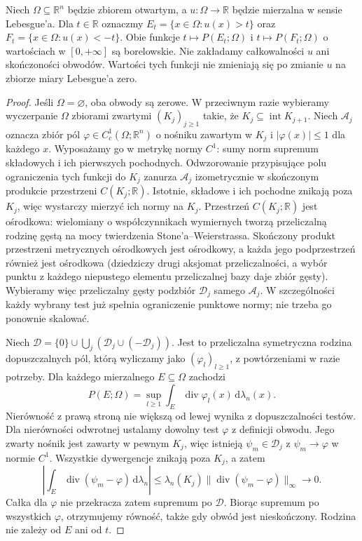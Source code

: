 \begin{lemat}
\label{lem:BV-level-meas-auditVI}
Niech $\Omega\subseteq\mathbb R^n$ będzie zbiorem otwartym,
a $u:\Omega\to\mathbb R$ będzie mierzalna
w sensie Lebesgue'a. Dla $t\in\mathbb R$ oznaczmy
$E_t=\{x\in\Omega:u(x)>t\}$ oraz
$F_t=\{x\in\Omega:u(x)<-t\}$.
Obie funkcje $t\mapsto P(E_t;\Omega)$ i
$t\mapsto P(F_t;\Omega)$ o wartościach
w $[0,+\infty]$ są borelowskie.
Nie zakładamy całkowalności $u$ ani skończoności
obwodów. Wartości tych funkcji nie zmieniają się
po zmianie $u$ na zbiorze miary Lebesgue'a zero.
\end{lemat}
\begin{proof}
Jeśli $\Omega=\varnothing$, oba obwody są zerowe.
W przeciwnym razie wybieramy wyczerpanie
$\Omega$ zbiorami zwartymi $(K_j)_{j\ge1}$
takie, że $K_j\subseteq\operatorname{int}K_{j+1}$.
Niech $\mathcal A_j$ oznacza zbiór pól
$\varphi\in C_c^1(\Omega;\mathbb R^n)$
o nośniku zawartym w $K_j$ i
$|\varphi(x)|\le1$ dla każdego $x$.
Wyposażamy go w metrykę normy $C^1$:
sumy norm supremum składowych i ich pierwszych
pochodnych. Odwzorowanie przypisujące polu
ograniczenia tych funkcji do $K_j$ zanurza
$\mathcal A_j$ izometrycznie w skończonym
produkcie przestrzeni $C(K_j;\mathbb R)$.
Istotnie, składowe i ich pochodne znikają
poza $K_j$, więc wystarczy mierzyć ich normy
na $K_j$. Przestrzeń $C(K_j;\mathbb R)$
jest ośrodkowa: wielomiany o współczynnikach
wymiernych tworzą przeliczalną rodzinę gęstą
na mocy twierdzenia Stone'a--Weierstrassa.
Skończony produkt przestrzeni metrycznych
ośrodkowych jest ośrodkowy, a każda jego
podprzestrzeń również jest ośrodkowa
(dziedziczy drugi aksjomat przeliczalności,
a wybór punktu z każdego niepustego elementu
przeliczalnej bazy daje zbiór gęsty).
Wybieramy więc przeliczalny gęsty podzbiór
$\mathcal D_j$ samego $\mathcal A_j$.
W szczególności każdy wybrany test już spełnia
ograniczenie punktowe normy; nie trzeba go
ponownie skalować.

Niech $\mathcal D=\{0\}\cup\bigcup_j
(\mathcal D_j\cup(-\mathcal D_j))$.
Jest to przeliczalna symetryczna rodzina
dopuszczalnych pól, którą wyliczamy jako
$(\varphi_l)_{l\ge1}$, z powtórzeniami w razie
potrzeby. Dla każdego mierzalnego $E\subseteq\Omega$
zachodzi
\[
 P(E;\Omega)=\sup_{l\ge1}
 \int_E\operatorname{div}\varphi_l(x)
 \,\mathrm d\lambda_n(x).
\]
Nierówność z prawą stroną nie większą od lewej
wynika z dopuszczalności testów.
Dla nierówności odwrotnej ustalamy dowolny test
$\varphi$ z definicji obwodu. Jego zwarty nośnik
jest zawarty w pewnym $K_j$, więc istnieją
$\psi_m\in\mathcal D_j$ z $\psi_m\to\varphi$
w normie $C^1$. Wszystkie dywergencje znikają
poza $K_j$, a zatem
\[
 \left|\int_E\operatorname{div}(\psi_m-\varphi)
 \,\mathrm d\lambda_n\right|
 \le\lambda_n(K_j)
 \|\operatorname{div}(\psi_m-\varphi)\|_\infty
 \longrightarrow0.
\]
Całka dla $\varphi$ nie przekracza zatem
supremum po $\mathcal D$. Biorąc supremum
po wszystkich $\varphi$, otrzymujemy równość,
także gdy obwód jest nieskończony.
Rodzina nie zależy od $E$ ani od $t$.


\end{proof}
